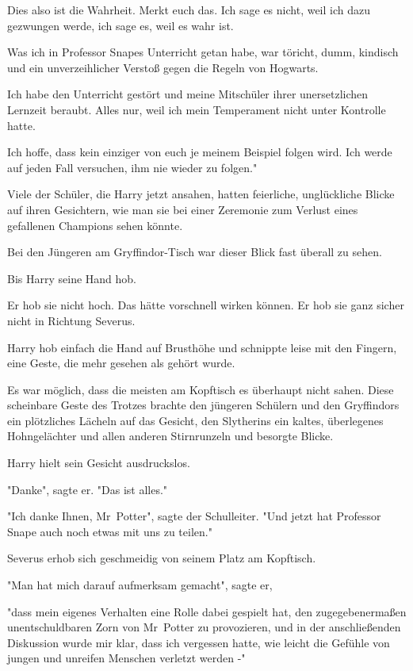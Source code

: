 {Dies also ist die Wahrheit. Merkt euch das. Ich sage es nicht, weil ich dazu gezwungen werde, ich sage es, weil es wahr ist.

Was ich in Professor Snapes Unterricht getan habe, war töricht, dumm, kindisch und ein unverzeihlicher Verstoß gegen die Regeln von Hogwarts.

Ich habe den Unterricht gestört und meine Mitschüler ihrer unersetzlichen Lernzeit beraubt. Alles nur, weil ich mein Temperament nicht unter Kontrolle hatte.

Ich hoffe, dass kein einziger von euch je meinem Beispiel folgen wird. Ich werde auf jeden Fall versuchen, ihm nie wieder zu folgen."

Viele der Schüler, die Harry jetzt ansahen, hatten feierliche, unglückliche Blicke auf ihren Gesichtern, wie man sie bei einer Zeremonie zum Verlust eines gefallenen Champions sehen könnte.

Bei den Jüngeren am Gryffindor-Tisch war dieser Blick fast überall zu sehen.

Bis Harry seine Hand hob.

Er hob sie nicht hoch. Das hätte vorschnell wirken können. Er hob sie ganz sicher nicht in Richtung Severus.

Harry hob einfach die Hand auf Brusthöhe und schnippte leise mit den Fingern, eine Geste, die mehr gesehen als gehört wurde.

Es war möglich, dass die meisten am Kopftisch es überhaupt nicht sahen. Diese scheinbare Geste des Trotzes brachte den jüngeren Schülern und den Gryffindors ein plötzliches Lächeln auf das Gesicht, den Slytherins ein kaltes, überlegenes Hohngelächter und allen anderen Stirnrunzeln und besorgte Blicke.

Harry hielt sein Gesicht ausdruckslos.

"Danke", sagte er. "Das ist alles."

"Ich danke Ihnen, Mr~Potter", sagte der Schulleiter. "Und jetzt hat Professor Snape auch noch etwas mit uns zu teilen."

Severus erhob sich geschmeidig von seinem Platz am Kopftisch.

"Man hat mich darauf aufmerksam gemacht", sagte er,

"dass mein eigenes Verhalten eine Rolle dabei gespielt hat, den zugegebenermaßen unentschuldbaren Zorn von Mr~Potter zu provozieren, und in der anschließenden Diskussion wurde mir klar, dass ich vergessen hatte, wie leicht die Gefühle von jungen und unreifen Menschen verletzt werden -"

}
